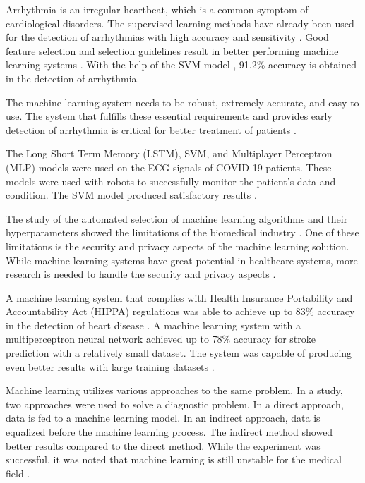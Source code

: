 \documentclass[a4paper,fleqn]{cas-dc}
\begin{document}
{    Arrhythmia is an irregular heartbeat, which is a common symptom of cardiological disorders. The supervised learning methods have already been used for the detection of arrhythmias with high accuracy and sensitivity \cite{ref_paper_16}. Good feature selection and selection guidelines result in better performing machine learning systems \cite{ref_paper_28}. With the help of the SVM model \cite{ref_paper_38}, 91.2\% accuracy is obtained in the detection of arrhythmia.
    
    The machine learning system needs to be robust, extremely accurate, and easy to use. The system that fulfills these essential requirements and provides early detection of arrhythmia is critical for better treatment of patients \cite{ref_paper_4}.
    
    The Long Short Term Memory (LSTM), SVM, and Multiplayer Perceptron (MLP) models were used on the ECG signals of COVID-19 patients. These models were used with robots to successfully monitor the patient's data and condition. The SVM model produced satisfactory results \cite{ref_paper_40}.
    
    The study of the automated selection of machine learning algorithms and their hyperparameters showed the limitations of the biomedical industry \cite{ref_paper_32}. One of these limitations is the security and privacy aspects of the machine learning solution. While machine learning systems have great potential in healthcare systems, more research is needed to handle the security and privacy aspects \cite{ref_paper_37}.
    
    A machine learning system that complies with Health Insurance Portability and Accountability Act (HIPPA) regulations was able to achieve up to 83\% accuracy in the detection of heart disease \cite{ref_paper_41}. A machine learning system with a multiperceptron neural network achieved up to 78\% accuracy for stroke prediction with a relatively small dataset. The system was capable of producing even better results with large training datasets \cite{ref_paper_42}.
    
    Machine learning utilizes various approaches to the same problem. In a study, two approaches were used to solve a diagnostic problem. In a direct approach, data is fed to a machine learning model. In an indirect approach, data is equalized before the machine learning process. The indirect method showed better results compared to the direct method. While the experiment was successful, it was noted that machine learning is still unstable for the medical field \cite{ref_paper_8}.
    
}
\end{document}

